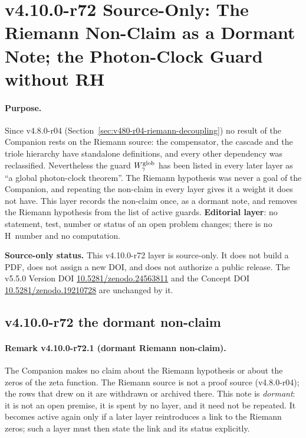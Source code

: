 \clearpage
\section*{v4.10.0-r72 Source-Only: The Riemann Non-Claim as a Dormant Note; the Photon-Clock Guard without RH}
\label{sec:v4100-r72-rh-dormant}

\paragraph{Purpose.}
Since v4.8.0-r04 (Section~\ref{sec:v480-r04-riemann-decoupling}) no result of the Companion rests on the Riemann source:
the compensator, the cascade and the triole hierarchy have standalone definitions, and every other dependency was reclassified.
Nevertheless the guard \(W_\gamma^{\rm glob}\) has been listed in every later layer as ``a global photon-clock theorem''.
The Riemann hypothesis was never a goal of the Companion, and repeating the non-claim in every layer gives it a weight it does not have.
This layer records the non-claim once, as a dormant note, and removes the Riemann hypothesis from the list of active guards.
\textbf{Editorial layer}: no statement, test, number or status of an open problem changes; there is no H~number and no computation.

\noindent\textbf{Source-only status.}
This v4.10.0-r72 layer is source-only.  It does not build a PDF, does not assign a new DOI,
and does not authorize a public release.  The v5.5.0 Version DOI
\href{https://doi.org/10.5281/zenodo.24563811}{10.5281/zenodo.24563811} and the Concept DOI
\href{https://doi.org/10.5281/zenodo.19210728}{10.5281/zenodo.19210728} are unchanged by it.

\subsection*{v4.10.0-r72 the dormant non-claim}
\label{subsec:v4100-r72-non-claim}

\paragraph{Remark v4.10.0-r72.1 (dormant Riemann non-claim).}
The Companion makes no claim about the Riemann hypothesis or about the zeros of the zeta function.  The Riemann source
\cite{brendecke2026rh} is not a proof source (v4.8.0-r04); the rows that drew on it are withdrawn or archived there.
This note is \emph{dormant}: it is not an open premise, it is spent by no layer, and it need not be repeated.  It becomes active
again only if a later layer reintroduces a link to the Riemann zeros; such a layer must then state the link and its status explicitly.

